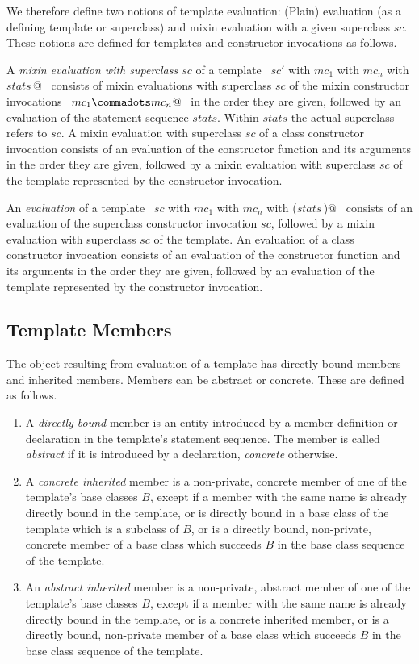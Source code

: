 \documentclass[a4paper,12pt,twoside,titlepage]{book}
\newcommand{\ifqualified}[1]{}
\begin{document}
We therefore define two notions of template evaluation: (Plain)
evaluation (as a defining template or superclass) and mixin evaluation
with a given superclass $sc$. These notions are defined for templates
and constructor invocations as follows.

A {\em mixin evaluation with superclass $sc$} of a template
~\lstinline@$sc'$ with $mc_1$ with $mc_n$ with {$stats\,$}@~ consists of mixin
evaluations with superclass $sc$ of the mixin constructor invocations
~\lstinline@$mc_1 \commadots mc_n$@~ in the order they are given, followed by an
evaluation of the statement sequence $stats$.  Within $stats$ the
actual superclass refers to $sc$.  A mixin evaluation with superclass
$sc$ of a class constructor invocation  consists of an evaluation
of the constructor function and its arguments in the order they are
given, followed by a mixin evaluation with superclass $sc$ of the
template represented by the constructor invocation.

An {\em evaluation} of a template
~\lstinline@$sc$ with $mc_1$ with $mc_n$ with ($stats\,$)@~ consists of an evaluation of
the superclass constructor invocation $sc$,
followed by a mixin evaluation with superclass $sc$ of the template. An
evaluation of a class constructor invocation  consists of an
evaluation of the constructor function and its arguments in
the order they are given, followed by an evaluation of the template
represented by the constructor invocation.

\subsection{Template Members}

\label{sec:members}

The object resulting from evaluation of a template has directly bound
members and inherited members. Members can be abstract or concrete.
These are defined as follows.
\begin{enumerate}
\item
A {\em directly bound} member is an entity introduced by a member
definition or declaration in the template's statement sequence. The
member is called {\em abstract} if it is introduced by a declaration,
{\em concrete} otherwise.
\item
A {\em concrete inherited} member is a non-private, concrete member of
one of the template's base classes $B$, except if a member with the
same \ifqualified{qualified} name is already directly bound in the template, or is
directly bound in a base class of the template which is a subclass of
$B$, or is a directly bound, non-private, concrete member of a base
class which succeeds $B$ in the base class sequence of the template.
\item
An {\em abstract inherited} member is a non-private, abstract member
of one of the template's base classes $B$, except if a member with the
same \ifqualified{qualified} name is already directly bound in the template, or is a
concrete inherited member, or is a directly bound, non-private member
of a base class which succeeds $B$ in the base class sequence of the
template.
\end{enumerate}
\end{document}
